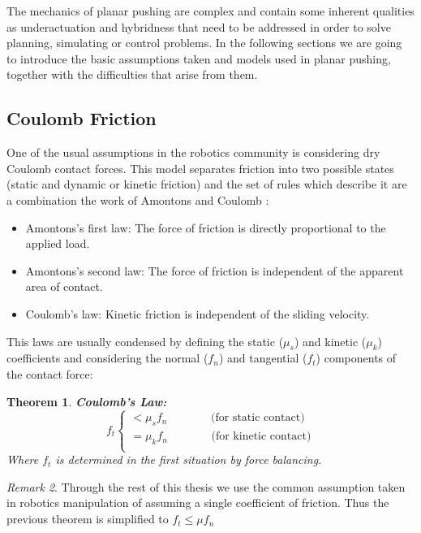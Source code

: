 \documentclass[12,twoside]{TFG-GM}
\newtheorem{theorem}{Theorem}[section]
\theoremstyle{definition}
\theoremstyle{remark}
\newtheorem{remark}[theorem]{Remark}
\begin{document}
The mechanics of planar pushing are complex and contain some inherent qualities as underactuation and hybridness that need to be addressed in order to solve planning, simulating or control problems. In the following sections we are going to introduce the basic assumptions taken and models used in planar pushing, together with the difficulties that arise from them.

\subsection{Coulomb Friction}
\label{subsec:coulomb}
One of the usual assumptions in the robotics community is considering dry Coulomb contact forces. This model separates friction into two possible states (static and dynamic or kinetic friction) and the set of rules which describe it are a combination the work of Amontons \cite{amontons} and Coulomb \cite{coulomb_law}:
\begin{itemize}
\item{Amontons's first law:} The force of friction is directly proportional to the applied load.
\item{Amontons's second law:} The force of friction is independent of the apparent area of contact.
\item{Coulomb's law:} Kinetic friction is independent of the sliding velocity.
\end{itemize}

This laws are usually condensed by defining the static ($\mu_s$) and kinetic ($\mu_k$) coefficients and considering the normal ($f_n$) and tangential ($f_t$) components of the contact force:

\begin{theorem} \textbf{Coulomb's Law:}
\[
  f_t\begin{cases}
               < \mu_s  f_n \,\,\,\,\,\,\,\,\,\,\,\,\,\,\,\,\,\,\,\,\,  \text{ (for static contact)}\\
               = \mu_k  f_n \,\,\,\,\,\,\,\,\,\,\,\,\,\,\,\,\,\,\,\,\,  \text{ (for kinetic contact)}\\
            \end{cases}
\]
Where $f_t$ is determined in the first situation by force balancing.
\end{theorem}

\begin{remark}
Through the rest of this thesis we use the common assumption taken in robotics manipulation of assuming a single coefficient of friction. Thus the previous theorem is simplified to $f_t \leq \mu f_n$
\end{remark}
\end{document}
